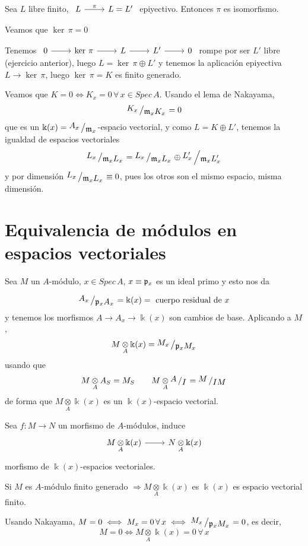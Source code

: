 \begin{ejer}
    Sea $L$ libre finito, $\bt L \arrow{r}{\pi} & L = L' \et$ epiyectivo. Entonces $\pi$ es isomorfismo.
\end{ejer}
\begin{sol} Veamos que $\ker \, \pi = 0$

Tenemos $\bt 0 \arrow{r} & \ker \, \pi \arrow{r} & L \arrow{r} & L' \arrow{r} & 0 \et$ rompe por ser $L'$ libre 
(ejercicio anterior), luego $L = \ker\, \pi \oplus L'$ y tenemos la aplicaci\'on epiyectiva $L\longrightarrow \ker\, \pi$, luego $\ker \, \pi = K$ es finito generado.

Veamos que $K= 0 \iff K_x = 0 \, \forall\, x\in Spec\, A$. Usando el lema de Nakayama, 
$$\modulo{K_x}{\m_x K_x} = 0$$
que es un $\Bbbk(x)=\modulo{A_x}{\m_x}$-espacio vectorial, y como $L = K \oplus L'$, tenemos la igualdad de espacios vectoriales
$$\modulo{L_x}{\m_x L_x} = \modulo{L_x}{\m_x L_x} \oplus \modulo{L'_x}{\m_x L'_x}$$
y por dimensi\'on $\modulo{L_x}{\m_x L_x} \equiv 0$, pues los otros son el mismo espacio, misma dimensi\'on.
\end{sol}
\section{Equivalencia de m\'odulos en espacios vectoriales}
Sea $M$ un $A$-m\'odulo, $x\in Spec\, A$, $x\equiv \mathfrak{p}_x$ es un ideal primo y esto nos da
\begin{defi}
$$\modulo{A_x}{\p_x A_x} = \Bbbk(x) = \text{ cuerpo residual de }x$$
y tenemos los morfismos $A \longrightarrow A_x \longrightarrow \Bbbk(x)$ son cambios de base. Aplicando a $M$, 
$$M \underset{A}{\otimes}\Bbbk(x) = \modulo{M_x}{\p_x M_x}$$
usando que 
$$M \underset{A}{\otimes} A_S = M_S \qquad M \underset{A}{\otimes} \modulo{A}{I} = \modulo{M}{IM}$$
de forma que $M \underset{A}{\otimes}\Bbbk(x)$ es un $\Bbbk(x)$-espacio vectorial. 
\end{defi}

Sea $f: M \longrightarrow N$ un morfismo de $A$-m\'odulos, induce 
$$\bt M \underset{A}{\otimes}\Bbbk(x) \arrow{r} & N \underset{A}{\otimes}\Bbbk(x) \et$$
morfismo de $\Bbbk(x)$-espacios vectoriales. 

Si $M$ es $A$-m\'odulo finito generado $\Rightarrow M \underset{A}{\otimes}\Bbbk(x)$ es $\Bbbk(x)$ es espacio vectorial finito.

Usando Nakayama, 
$M = 0 \iff M_x =0 \, \forall \, x \iff \modulo{M_x}{\p_x M_x} = 0$, es decir, 
$$M =0 \iff M \underset{A}{\otimes}\Bbbk(x) = 0 \, \forall\, x$$


